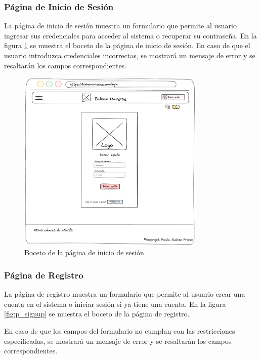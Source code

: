 \subsubsection{Página de Inicio de Sesión}
La página de inicio de sesión muestra un formulario que permite al usuario ingresar sus credenciales para acceder al sistema o recuperar su contraseña.
En la figura \ref{fig:p_login} se muestra el boceto de la página de inicio de sesión.
En caso de que el usuario introduzca credenciales incorrectas, se mostrará un mensaje de error y se resaltarán los campos correspondientes.

\begin{figure}[H]
    \centering
    \includegraphics[width=0.8\textwidth]{figures/6-Analisis/6-Interfaz/prototipos/login.png}
    \caption{Boceto de la página de inicio de sesión}
    \label{fig:p_login}
\end{figure}

\subsubsection{Página de Registro}
La página de registro muestra un formulario que permite al usuario crear una cuenta en el sistema o iniciar sesión si ya tiene una cuenta.
En la figura \ref{fig:p_signup} se muestra el boceto de la página de registro.

En caso de que los campos del formulario no cumplan con las restricciones especificadas, se mostrará un mensaje de error y se resaltarán los campos correspondientes.


